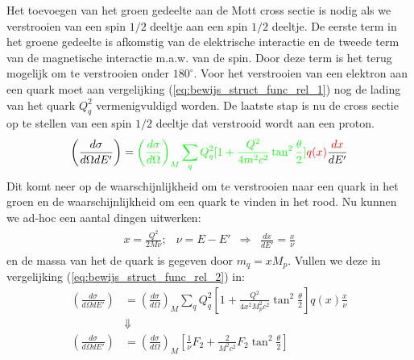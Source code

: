 \documentclass[../main.tex]{subfiles}
\begin{document}
Het toevoegen van het groen gedeelte aan de Mott cross sectie is nodig als we verstrooien van een spin $1/2$ deeltje aan een spin $1/2$ deeltje. De eerste term in het groene gedeelte is afkomstig van de elektrische interactie en de tweede term van de magnetische interactie m.a.w. van de spin. Door deze term is het terug mogelijk om te verstrooien onder $180^\circ$. Voor het verstrooien van een elektron aan een quark moet aan vergelijking (\ref{eq:bewijs_struct_func_rel_1}) nog de lading van het quark $Q_q^2$ vermenigvuldigd worden. De laatste stap is nu de cross sectie op te stellen van een spin $1/2$ deeltje dat verstrooid wordt aan een proton.
\begin{equation}
    \begin{aligned}
        \label{eq:bewijs_struct_func_rel_2}
        \left(\frac{d\sigma}{d\Omega dE'}\right) = {\color{green} \left(\frac{d\sigma}{d\Omega}\right)_{M} \sum_q Q_q^2 [1+ \frac{Q^2}{4m^2c^2} \tan^2 \frac{\theta}{2}]} {\color{red}q(x)} \frac{{\color{red}dx}}{dE'} 
    \end{aligned}
\end{equation}
Dit komt neer op de waarschijnlijkheid om te verstrooien naar een quark in het groen en de waarschijnlijkheid om een quark te vinden in het rood. Nu kunnen we ad-hoc een aantal dingen uitwerken:
\begin{equation}
    \begin{aligned}
        \label{eq:bewijs_struct_func_rel_3}
        \begin{matrix}
            x = \frac{Q^2}{2M\nu}; & \nu = E-E' & \Rightarrow & \frac{dx}{dE'} = \frac{x}{\nu} 
        \end{matrix}
    \end{aligned}
\end{equation}
en de massa van het de quark is gegeven door $m_q = xM_p$. Vullen we deze in vergelijking (\ref{eq:bewijs_struct_func_rel_2}) in:
\begin{equation}
    \begin{aligned}
        \label{eq:bewijs_struct_func_rel_4}
        \left(\frac{d\sigma}{d\Omega dE'}\right) &= \left(\frac{d\sigma}{d\Omega}\right)_{M} \sum_q Q_q^2 [1+ \frac{Q^2}{4x^2M_p^2c^2} \tan^2 \frac{\theta}{2}]q(x) \frac{x}{\nu}\\
                                                 &\Downarrow\\
        \left(\frac{d\sigma}{d\Omega dE'}\right) &= \left(\frac{d\sigma}{d\Omega}\right)_{M} \left[ \frac{1}{\nu} F_2 + \frac{2}{M^2c^2} F_2 \tan^2 \frac{\theta}{2} \right]
    \end{aligned}
\end{equation}
\end{document}
